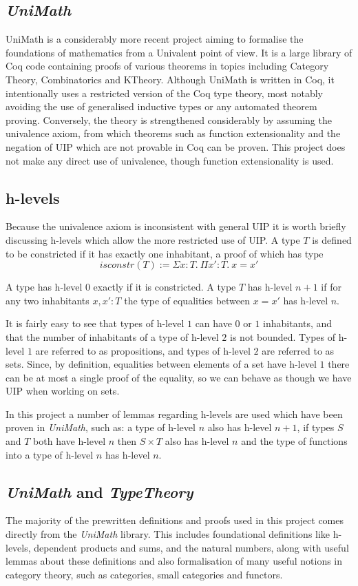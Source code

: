 \subsection{\textit{UniMath}}
UniMath is a considerably more recent project aiming to formalise the
foundations of mathematics from a Univalent point of view. It is a large library
of Coq code containing proofs of various theorems in topics including Category
Theory, Combinatorics and KTheory. Although UniMath is written in Coq, it
intentionally uses a restricted version of the Coq type theory, most notably
avoiding the use of generalised inductive types or any automated theorem
proving. Conversely, the theory is strengthened considerably by assuming the
univalence axiom, from which theorems such as function extensionality and the
negation of UIP which are not provable in Coq can be proven. This project does
not make any direct use of univalence, though function extensionality is used.

\subsection{h-levels}
Because the univalence axiom is inconsistent with general UIP it is worth
briefly discussing h-levels which allow the more restricted use of UIP. A type
$T$ is defined to be constricted if it has exactly one inhabitant, a proof of
which has type
\[isconstr(T) := \Sigma x:T.\ \Pi x':T.\ x=x'\]

A type has h-level $0$ exactly if it is constricted. A type $T$ has h-level
$n+1$ if for any two inhabitants $x, x': T$ the type of equalities between
$x=x'$ has h-level $n$.

It is fairly easy to see that types of h-level $1$ can have $0$ or $1$
inhabitants, and that the number of inhabitants of a type of h-level $2$ is not
bounded. Types of h-level $1$ are referred to as propositions, and types of
h-level $2$ are referred to as sets. Since, by definition, equalities between
elements of a set have h-level $1$ there can be at most a single proof of the
equality, so we can behave as though we have UIP when working on sets.

In this project a number of lemmas regarding h-levels are used which have been
proven in \textit{UniMath}, such as: a type of h-level $n$ also has h-level
$n+1$, if types $S$ and $T$ both have h-level $n$ then $S\times T$ also has
h-level $n$ and the type of functions into a type of h-level $n$ has h-level
$n$.

\subsection{\textit{UniMath} and \textit{TypeTheory}}
The majority of the prewritten definitions and proofs used in this project comes
directly from the \textit{UniMath} library. This includes foundational
definitions like h-levels, dependent products and sums, and the natural numbers,
along with useful lemmas about these definitions and also formalisation of many
useful notions in category theory, such as categories, small categories and
functors.

